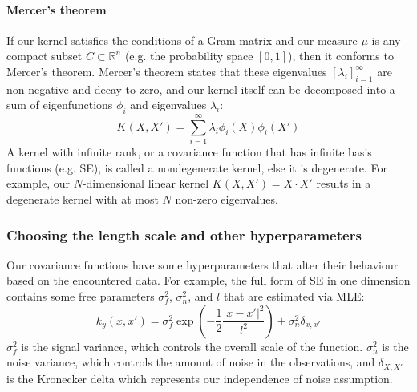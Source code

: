 \paragraph{Mercer's theorem}
If our kernel satisfies the conditions of a Gram matrix and our measure $\mu$ is any compact subset $C \subset \mathbb{R}^n$ (e.g. the probability space $[0,1]$), then it conforms to Mercer's theorem. Mercer's theorem states that these eigenvalues $[\lambda_i]_{i=1}^\infty$ are non-negative and decay to zero, and our kernel itself can be decomposed into a sum of eigenfunctions $\phi_i$ and eigenvalues $\lambda_i$:
\begin{equation} \label{eq:gp_mercer}
    K(X, X') = \sum_{i=1}^{\infty} \lambda_i \phi_i(X) \phi_i(X')
\end{equation}
A kernel with infinite rank, or a covariance function that has infinite basis functions (e.g. SE), is called a nondegenerate kernel, else it is degenerate. For example, our $N$-dimensional linear kernel $K(X, X') = X \cdot X'$ results in a degenerate kernel with at most $N$ non-zero eigenvalues.


\subsubsection{Choosing the length scale and other hyperparameters}
Our covariance functions have some hyperparameters that alter their behaviour based on the encountered data. For example, the full form of SE in one dimension contains some free parameters $\sigma^2_f$, $\sigma^2_n$, and $l$ that are estimated via MLE:
\begin{equation*}
    k_y(x,x') = \sigma^2_f \exp\left(-\frac{1}{2}\frac{|x - x'|^2}{l^2}\right) + \sigma^2_n\delta_{x,x'}
\end{equation*}
$\sigma^2_f$ is the signal variance, which controls the overall scale of the function. $\sigma^2_n$ is the noise variance, which controls the amount of noise in the observations, and $\delta_{X,X'}$ is the Kronecker delta which represents our independence of noise assumption. 

